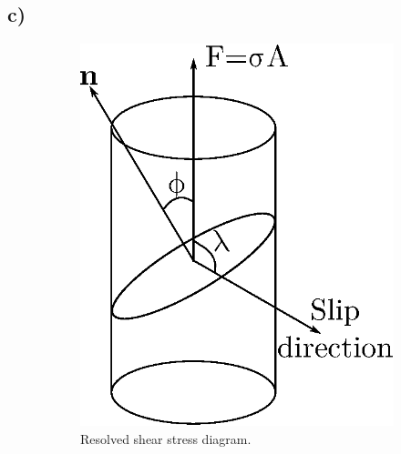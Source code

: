 \documentclass[a4paper]{article}
\begin{document}
	\subsection{c)}
	\begin{figure}
		\centering
		\begin{subfigure}[b]{0.35\linewidth}
			\centering
			\includegraphics[width=\linewidth]{rstress.eps}
			\caption{Resolved shear stress diagram.}
		\end{subfigure}
		~
		\begin{subfigure}[b]{0.2\linewidth}
			\centering

\end{subfigure}
\end{figure}
\end{document}
